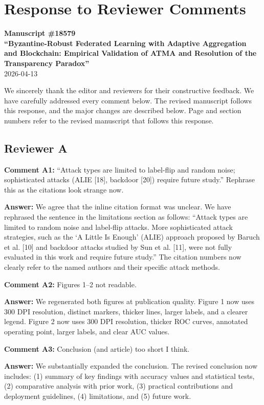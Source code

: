 \documentclass[12pt,a4paper,onecolumn]{article}
\begin{document}
\section*{Response to Reviewer Comments}
\textbf{Manuscript \#18579}\\
\textbf{``Byzantine-Robust Federated Learning with Adaptive Aggregation and Blockchain: Empirical Validation of ATMA and Resolution of the Transparency Paradox''}\\
2026-04-13

We sincerely thank the editor and reviewers for their constructive feedback. We have carefully addressed every comment below. The revised manuscript follows this response, and the major changes are described below. Page and section numbers refer to the revised manuscript that follows this response.

\subsection*{Reviewer A}
\textbf{Comment A1:} ``Attack types are limited to label-flip and random noise; sophisticated attacks (ALIE [18], backdoor [20]) require future study.'' Rephrase this as the citations look strange now.

\textbf{Answer:} We agree that the inline citation format was unclear. We have rephrased the sentence in the limitations section as follows: ``Attack types are limited to random noise and label-flip attacks. More sophisticated attack strategies, such as the `A Little Is Enough' (ALIE) approach proposed by Baruch et al. [10] and backdoor attacks studied by Sun et al. [11], were not fully evaluated in this work and require future study.'' The citation numbers now clearly refer to the named authors and their specific attack methods.

\textbf{Comment A2:} Figures 1--2 not readable.

\textbf{Answer:} We regenerated both figures at publication quality. Figure 1 now uses 300 DPI resolution, distinct markers, thicker lines, larger labels, and a clearer legend. Figure 2 now uses 300 DPI resolution, thicker ROC curves, annotated operating point, larger labels, and clear AUC values.

\textbf{Comment A3:} Conclusion (and article) too short I think.

\textbf{Answer:} We substantially expanded the conclusion. The revised conclusion now includes: (1) summary of key findings with accuracy values and statistical tests, (2) comparative analysis with prior work, (3) practical contributions and deployment guidelines, (4) limitations, and (5) future work.
\end{document}
